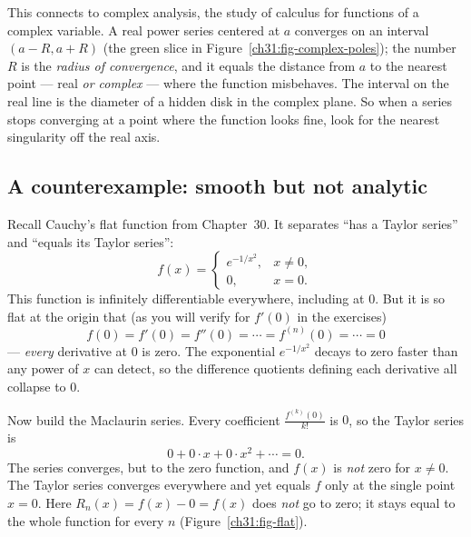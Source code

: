 \begin{connectionbox}
This connects to complex analysis, the study of calculus for functions of a complex
variable. A real power series centered at $a$ converges
on an interval $(a-R, a+R)$ (the green slice in Figure~\ref{ch31:fig-complex-poles});
the number $R$ is the \emph{radius of convergence}, and
it equals the distance from $a$ to the nearest point --- real \emph{or complex} ---
where the function misbehaves. The interval on the real line is the diameter of a
hidden disk in the complex plane. So when a series stops converging at a point where
the function looks fine, look for the nearest singularity off the real axis.
\end{connectionbox}

\subsection{A counterexample: smooth but not analytic}

Recall Cauchy's flat function from Chapter~30. It separates
``has a Taylor series'' and ``equals its Taylor series'':
\[
  f(x) =
  \begin{cases}
    e^{-1/x^2}, & x \ne 0, \\
    0, & x = 0.
  \end{cases}
\]
This function is infinitely differentiable everywhere, including at $0$. But it is so
flat at the origin that (as you will verify for $f'(0)$ in the exercises)
\[
  f(0) = f'(0) = f''(0) = \cdots = f^{(n)}(0) = \cdots = 0
\]
--- \emph{every} derivative at $0$ is zero. The exponential $e^{-1/x^2}$ decays to
zero faster than any power of $x$ can detect, so the difference quotients defining
each derivative all collapse to $0$.

Now build the Maclaurin series. Every coefficient $\frac{f^{(k)}(0)}{k!}$ is $0$, so
the Taylor series is
\[
  0 + 0\cdot x + 0\cdot x^2 + \cdots = 0.
\]
The series converges, but to the zero function, and $f(x)$ is \emph{not}
zero for $x \ne 0$. The Taylor series converges everywhere and yet equals $f$ only at
the single point $x=0$. Here $R_n(x) = f(x) - 0 = f(x)$ does \emph{not} go to zero;
it stays equal to the whole function for every $n$ (Figure~\ref{ch31:fig-flat}).

